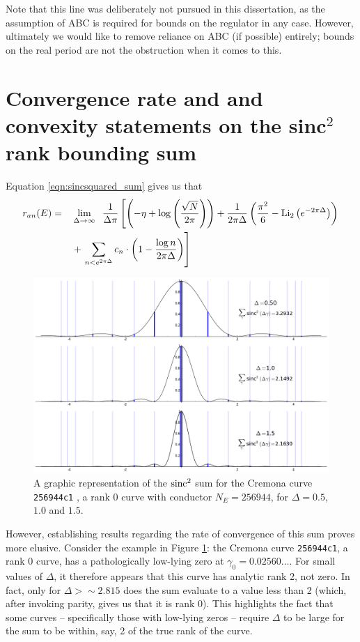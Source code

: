 Note that this line was deliberately not pursued in this dissertation, as the assumption of ABC is required for bounds on the regulator in any case. However, ultimately we would like to remove reliance on ABC (if possible) entirely; bounds on the real period are not the obstruction when it comes to this.

\section{Convergence rate and and convexity statements on the sinc$^2$ rank bounding sum}

Equation \ref{eqn:sincsquared_sum} gives us that
\begin{align}
r_{an}(E) = \quad & \lim_{\Delta \to \infty} \;\; \frac{1}{\Delta \pi}\left[\left(-\eta + \log\left(\frac{\sqrt{N}}{2\pi}\right)\right)+ \frac{1}{2\pi \Delta}\left(\frac{\pi^2}{6} - \text{Li}_2\left(e^{-2\pi \Delta}\right)\right)  \right. \nonumber \\
&+ \left.\sum_{n<e^{2\pi \Delta}} c_n \cdot \left(1-\frac{\log n}{2\pi \Delta}\right)\right]
\end{align}

\begin{figure}[!h]
    \centering
    \includegraphics[width=1.0\textwidth]{graphics/256944c1_zero_sum.png}
    \caption{A graphic representation of the $\text{sinc}^2$ sum for the Cremona curve {\tt 256944c1} , a rank 0 curve with conductor $N_E=256944$, for $\Delta = 0.5$, $1.0$ and $1.5$.}
    \label{fig:256944c1_zero_sum}
\end{figure}

However, establishing results regarding the rate of convergence of this sum proves more elusive. Consider the example in Figure \ref{fig:256944c1_zero_sum}: the Cremona curve {\tt 256944c1}, a rank 0 curve, has a pathologically low-lying zero at $\gamma_0 = 0.02560\ldots$. For small values of $\Delta$, it therefore appears that this curve has analytic rank 2, not zero. In fact, only for $\Delta>\sim 2.815$ does the sum evaluate to a value less than 2 (which, after invoking parity, gives us that it is rank 0). This highlights the fact that some curves -- specifically those with low-lying zeros -- require $\Delta$ to be large for the sum to be within, say, 2 of the true rank of the curve. \\

